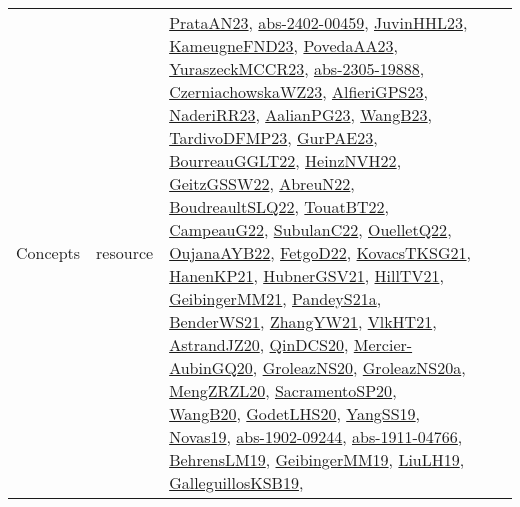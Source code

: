 {\begin{longtable}{lp{3cm}>{\raggedright}p{6cm}>{\raggedright}p{6cm}p{8cm}}
Concepts & resource & \href{articles/PrataAN23.pdf}{PrataAN23}\cite{PrataAN23}, \href{articles/abs-2402-00459.pdf}{abs-2402-00459}\cite{abs-2402-00459}, \href{papers/JuvinHHL23.pdf}{JuvinHHL23}\cite{JuvinHHL23}, \href{papers/KameugneFND23.pdf}{KameugneFND23}\cite{KameugneFND23}, \href{papers/PovedaAA23.pdf}{PovedaAA23}\cite{PovedaAA23}, \href{articles/YuraszeckMCCR23.pdf}{YuraszeckMCCR23}\cite{YuraszeckMCCR23}, \href{articles/abs-2305-19888.pdf}{abs-2305-19888}\cite{abs-2305-19888}, \href{articles/CzerniachowskaWZ23.pdf}{CzerniachowskaWZ23}\cite{CzerniachowskaWZ23}, \href{articles/AlfieriGPS23.pdf}{AlfieriGPS23}\cite{AlfieriGPS23}, \href{articles/NaderiRR23.pdf}{NaderiRR23}\cite{NaderiRR23}, \href{papers/AalianPG23.pdf}{AalianPG23}\cite{AalianPG23}, \href{papers/WangB23.pdf}{WangB23}\cite{WangB23}, \href{papers/TardivoDFMP23.pdf}{TardivoDFMP23}\cite{TardivoDFMP23}, \href{articles/GurPAE23.pdf}{GurPAE23}\cite{GurPAE23}, \href{articles/BourreauGGLT22.pdf}{BourreauGGLT22}\cite{BourreauGGLT22}, \href{articles/HeinzNVH22.pdf}{HeinzNVH22}\cite{HeinzNVH22}, \href{papers/GeitzGSSW22.pdf}{GeitzGSSW22}\cite{GeitzGSSW22}, \href{articles/AbreuN22.pdf}{AbreuN22}\cite{AbreuN22}, \href{papers/BoudreaultSLQ22.pdf}{BoudreaultSLQ22}\cite{BoudreaultSLQ22}, \href{papers/TouatBT22.pdf}{TouatBT22}\cite{TouatBT22}, \href{articles/CampeauG22.pdf}{CampeauG22}\cite{CampeauG22}, \href{articles/SubulanC22.pdf}{SubulanC22}\cite{SubulanC22}, \href{papers/OuelletQ22.pdf}{OuelletQ22}\cite{OuelletQ22}, \href{papers/OujanaAYB22.pdf}{OujanaAYB22}\cite{OujanaAYB22}, \href{articles/FetgoD22.pdf}{FetgoD22}\cite{FetgoD22}, \href{papers/KovacsTKSG21.pdf}{KovacsTKSG21}\cite{KovacsTKSG21}, \href{papers/HanenKP21.pdf}{HanenKP21}\cite{HanenKP21}, \href{articles/HubnerGSV21.pdf}{HubnerGSV21}\cite{HubnerGSV21}, \href{papers/HillTV21.pdf}{HillTV21}\cite{HillTV21}, \href{papers/GeibingerMM21.pdf}{GeibingerMM21}\cite{GeibingerMM21}, \href{articles/PandeyS21a.pdf}{PandeyS21a}\cite{PandeyS21a}, \href{papers/BenderWS21.pdf}{BenderWS21}\cite{BenderWS21}, \href{articles/ZhangYW21.pdf}{ZhangYW21}\cite{ZhangYW21}, \href{articles/VlkHT21.pdf}{VlkHT21}\cite{VlkHT21}, \href{articles/AstrandJZ20.pdf}{AstrandJZ20}\cite{AstrandJZ20}, \href{articles/QinDCS20.pdf}{QinDCS20}\cite{QinDCS20}, \href{papers/Mercier-AubinGQ20.pdf}{Mercier-AubinGQ20}\cite{Mercier-AubinGQ20}, \href{papers/GroleazNS20.pdf}{GroleazNS20}\cite{GroleazNS20}, \href{papers/GroleazNS20a.pdf}{GroleazNS20a}\cite{GroleazNS20a}, \href{articles/MengZRZL20.pdf}{MengZRZL20}\cite{MengZRZL20}, \href{articles/SacramentoSP20.pdf}{SacramentoSP20}\cite{SacramentoSP20}, \href{papers/WangB20.pdf}{WangB20}\cite{WangB20}, \href{papers/GodetLHS20.pdf}{GodetLHS20}\cite{GodetLHS20}, \href{papers/YangSS19.pdf}{YangSS19}\cite{YangSS19}, \href{articles/Novas19.pdf}{Novas19}\cite{Novas19}, \href{articles/abs-1902-09244.pdf}{abs-1902-09244}\cite{abs-1902-09244}, \href{articles/abs-1911-04766.pdf}{abs-1911-04766}\cite{abs-1911-04766}, \href{papers/BehrensLM19.pdf}{BehrensLM19}\cite{BehrensLM19}, \href{papers/GeibingerMM19.pdf}{GeibingerMM19}\cite{GeibingerMM19}, \href{papers/LiuLH19.pdf}{LiuLH19}\cite{LiuLH19}, \href{papers/GalleguillosKSB19.pdf}{GalleguillosKSB19}\cite{GalleguillosKSB19}, 
\end{longtable}}
